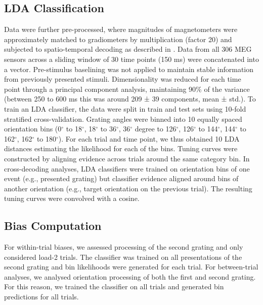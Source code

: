 \documentclass{article}
\begin{document}
\subsection{LDA Classification}
Data were further pre-processed, where magnitudes of magnetometers were approximately matched to gradiometers by multiplication (factor 20) and subjected to spatio-temporal decoding as described in \parencite{Hajonides2021, Wolff2017, Wolff2020}. Data from all 306 MEG sensors across a sliding window of 30 time points (150 ms) were concatenated into a vector. Pre-stimulus baselining was not applied to maintain stable information from previously presented stimuli. Dimensionality was reduced for each time point through a principal component analysis, maintaining 90\% of the variance (between 250 to 600 ms this was around 209 ± 39 components, mean ± std.). To train an LDA classifier, the data were split in train and test sets using 10-fold stratified cross-validation. Grating angles were binned into 10 equally spaced orientation bins (0$^{\circ}$ to 18$^{\circ}$, 18$^{\circ}$ to 36$^{\circ}$, 36$^{\circ}$ degree to 126$^{\circ}$, 126$^{\circ}$ to  144$^{\circ}$, 144$^{\circ}$ to 162$^{\circ}$, 162$^{\circ}$ to 180$^{\circ}$). For each trial and time point, we thus obtained 10 LDA distances estimating the likelihood for each of the bins. Tuning curves were constructed by aligning evidence across trials around the same category bin. In cross-decoding analyses, LDA classifiers were trained on orientation bins of one event (e.g., presented grating) but classifier evidence aligned around bins of another orientation (e.g., target orientation on the previous trial). The resulting tuning curves were convolved with a cosine.\\

\subsection{Bias Computation}
For within-trial biases, we assessed processing of the second grating and only considered load-2 trials. The classifier was trained on all presentations of the second grating and bin likelihoods were generated for each trial. For between-trial analyses, we analysed orientation processing of both the first and second grating. For this reason, we trained the classifier on all trials and generated bin predictions for all trials. 
\end{document}
